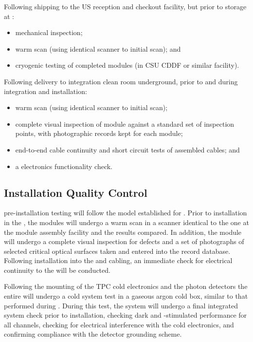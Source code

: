 Following shipping to the US reception and checkout facility, but prior to storage at :
\begin{itemize}
\item mechanical inspection;
\item warm scan (using identical scanner to initial scan); and
\item cryogenic testing of completed modules (in CSU CDDF or similar facility).
\end{itemize}

Following delivery to integration clean room underground, prior to and during integration and installation:
\begin{itemize}
\item warm scan (using identical scanner to initial scan);
\item complete visual inspection of module against a standard set of inspection points, with photographic records kept for each module;
\item end-to-end cable continuity and short circuit tests of assembled cables; and
\item a  electronics functionality check.
\end{itemize}

\subsection{Installation Quality Control}
\label{sec:fdsp-pd-installqc}

 pre-installation testing will follow the model established for .  Prior to installation in the , the  modules will undergo a warm scan in a scanner identical to the one at the  module assembly facility and the results compared.  In addition, the module will undergo a complete visual inspection for defects and a set of photographs of selected critical optical surfaces taken and entered into the  record database.  Following installation into the  and cabling, an immediate check for electrical continuity to the  will be conducted.

Following the mounting of the TPC cold electronics and the photon detectors the entire  will undergo a cold system test in a gaseous argon cold box, similar to that performed during .  During this test, the  system will undergo a final integrated system check prior to installation, checking dark and -stimulated  performance for all channels, checking for electrical interference with the cold electronics, and confirming compliance with the detector grounding scheme.